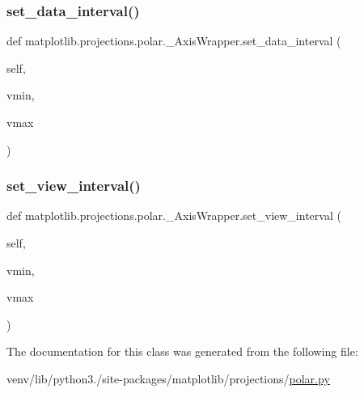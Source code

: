 \subsubsection{\texorpdfstring{set\+\_\+data\+\_\+interval()}{set\_data\_interval()}}
{\footnotesize\ttfamily def matplotlib.\+projections.\+polar.\+\_\+\+Axis\+Wrapper.\+set\+\_\+data\+\_\+interval (\begin{DoxyParamCaption}\item[{}]{self,  }\item[{}]{vmin,  }\item[{}]{vmax }\end{DoxyParamCaption})}

\mbox{\label{classmatplotlib_1_1projections_1_1polar_1_1__AxisWrapper_a0aab2197685283ac9ad73f326e28e261}} 
\subsubsection{\texorpdfstring{set\+\_\+view\+\_\+interval()}{set\_view\_interval()}}
{\footnotesize\ttfamily def matplotlib.\+projections.\+polar.\+\_\+\+Axis\+Wrapper.\+set\+\_\+view\+\_\+interval (\begin{DoxyParamCaption}\item[{}]{self,  }\item[{}]{vmin,  }\item[{}]{vmax }\end{DoxyParamCaption})}



The documentation for this class was generated from the following file\+:\begin{DoxyCompactItemize}
\item 
venv/lib/python3./site-\/packages/matplotlib/projections/\hyperlink{polar_8py}{polar.\+py}\end{DoxyCompactItemize}
